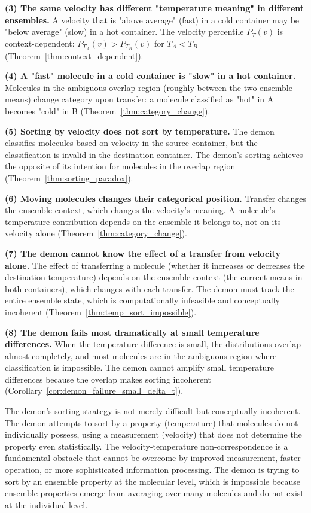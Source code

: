 \documentclass[12pt,a4paper]{article}
\theoremstyle{definition}
\theoremstyle{remark}
\begin{document}
\textbf{(3) The same velocity has different "temperature meaning" in different ensembles.} A velocity that is "above average" (fast) in a cold container may be "below average" (slow) in a hot container. The velocity percentile $P_T(v)$ is context-dependent: $P_{T_A}(v) > P_{T_B}(v)$ for $T_A < T_B$ (Theorem~\ref{thm:context_dependent}).

\textbf{(4) A "fast" molecule in a cold container is "slow" in a hot container.} Molecules in the ambiguous overlap region (roughly between the two ensemble means) change category upon transfer: a molecule classified as "hot" in A becomes "cold" in B (Theorem~\ref{thm:category_change}).

\textbf{(5) Sorting by velocity does not sort by temperature.} The demon classifies molecules based on velocity in the source container, but the classification is invalid in the destination container. The demon's sorting achieves the opposite of its intention for molecules in the overlap region (Theorem~\ref{thm:sorting_paradox}).

\textbf{(6) Moving molecules changes their categorical position.} Transfer changes the ensemble context, which changes the velocity's meaning. A molecule's temperature contribution depends on the ensemble it belongs to, not on its velocity alone (Theorem~\ref{thm:category_change}).

\textbf{(7) The demon cannot know the effect of a transfer from velocity alone.} The effect of transferring a molecule (whether it increases or decreases the destination temperature) depends on the ensemble context (the current means in both containers), which changes with each transfer. The demon must track the entire ensemble state, which is computationally infeasible and conceptually incoherent (Theorem~\ref{thm:temp_sort_impossible}).

\textbf{(8) The demon fails most dramatically at small temperature differences.} When the temperature difference is small, the distributions overlap almost completely, and most molecules are in the ambiguous region where classification is impossible. The demon cannot amplify small temperature differences because the overlap makes sorting incoherent (Corollary~\ref{cor:demon_failure_small_delta_t}).

The demon's sorting strategy is not merely difficult but conceptually incoherent. The demon attempts to sort by a property (temperature) that molecules do not individually possess, using a measurement (velocity) that does not determine the property even statistically. The velocity-temperature non-correspondence is a fundamental obstacle that cannot be overcome by improved measurement, faster operation, or more sophisticated information processing. The demon is trying to sort by an ensemble property at the molecular level, which is impossible because ensemble properties emerge from averaging over many molecules and do not exist at the individual level.
\end{document}
